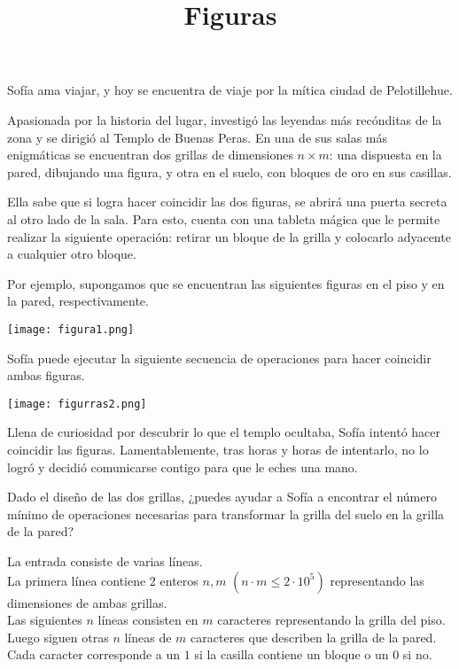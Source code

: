 \documentclass{oci}
\title{Figuras}
\begin{document}
\begin{problemDescription}
Sofía ama viajar, y hoy se encuentra de viaje por la mítica ciudad de Pelotillehue.

Apasionada por la historia del lugar, investigó las leyendas más recónditas de la zona y se dirigió al Templo de Buenas Peras. En una de sus salas más enigmáticas se encuentran dos grillas de dimensiones $n \times m$: una dispuesta en la pared, dibujando una figura, y otra en el suelo, con bloques de oro en sus casillas.

Ella sabe que si logra hacer coincidir las dos figuras, se abrirá una puerta secreta al otro lado de la sala. Para esto, cuenta con una tableta mágica que le permite realizar la siguiente operación: retirar un bloque de la grilla y colocarlo adyacente a cualquier otro bloque.

Por ejemplo, supongamos que se encuentran las siguientes figuras en el piso y en la pared, respectivamente.

\begin{center}
    \texttt{[image: figura1.png]}
\end{center}

Sofía puede ejecutar la siguiente secuencia de operaciones para hacer coincidir ambas figuras.

\begin{center}
    \texttt{[image: figurras2.png]}
\end{center}

Llena de curiosidad por descubrir lo que el templo ocultaba, Sofía intentó hacer coincidir las figuras. Lamentablemente, tras horas y horas de intentarlo, no lo logró y decidió comunicarse contigo para que le eches una mano.

Dado el diseño de las dos grillas, ¿puedes ayudar a Sofía a encontrar el número mínimo de operaciones necesarias para transformar la grilla del suelo en la grilla de la pared?

\end{problemDescription}

\begin{inputDescription}
La entrada consiste de varias líneas.\\
La primera línea contiene 2 enteros $n, m$ $(n \cdot m \leq 2 \cdot 10^5)$ representando las dimensiones de ambas grillas.\\

Las siguientes $n$ líneas consisten en $m$ caracteres representando la grilla del piso.\\

Luego siguen otras $n$ líneas de $m$ caracteres que describen la grilla de la pared.\\

Cada caracter corresponde a un $1$ si la casilla contiene un bloque o un $0$ si no.
\end{inputDescription}
\end{document}
